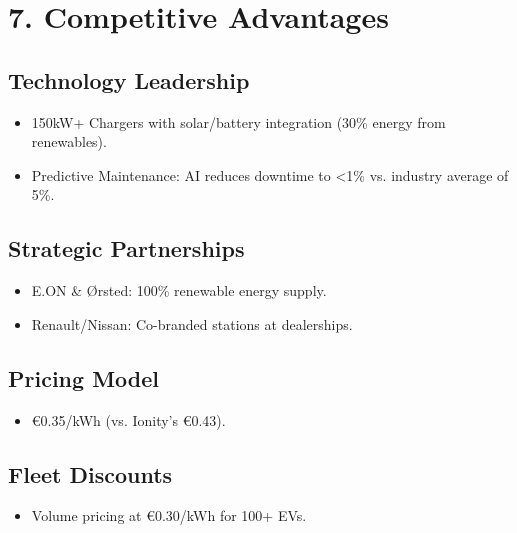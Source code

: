 \section{7. Competitive Advantages}

\subsection*{Technology Leadership}
\begin{itemize}
    \item 150kW+ Chargers with solar/battery integration (30\% energy from renewables).
    \item Predictive Maintenance: AI reduces downtime to <1\% vs. industry average of 5\%.
\end{itemize}

\subsection*{Strategic Partnerships}
\begin{itemize}
    \item E.ON \& Ørsted: 100\% renewable energy supply.
    \item Renault/Nissan: Co-branded stations at dealerships.
\end{itemize}

\subsection*{Pricing Model}
\begin{itemize}
    \item €0.35/kWh (vs. Ionity’s €0.43).
\end{itemize}

\subsection*{Fleet Discounts}
\begin{itemize}
    \item Volume pricing at €0.30/kWh for 100+ EVs.
\end{itemize}
